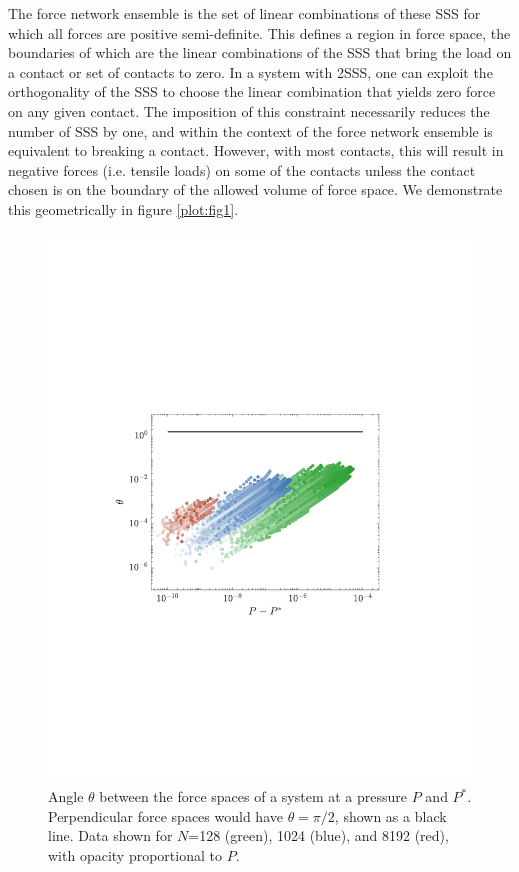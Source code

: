 The force network ensemble is the set of linear combinations of these SSS for which all forces are positive semi-definite. This defines a region in force space, the boundaries of which are the linear combinations of the SSS that bring the load on a contact or set of contacts to zero. 
In a system with 2SSS, one can exploit the orthogonality of the SSS to choose the linear combination that yields zero force on any given contact. The imposition of this constraint necessarily reduces the number of SSS by one, and within the context of the force network ensemble is equivalent to breaking a contact. However, with most contacts, this will result in negative forces (i.e. tensile loads) on some of the contacts unless the contact chosen is on the boundary of the allowed volume of force space. We demonstrate this geometrically in figure \ref{plot:fig1}.  



\begin{figure}[t!]
\includegraphics[width=\columnwidth, trim=94 242 130 260, clip]{contactBreakingPaper/angleVsPressure.pdf}
\caption{Angle $\theta$ between the force spaces of a system at a pressure $P$ and $P^*$. Perpendicular force spaces would have $\theta = \pi/2$, shown as a black line. Data shown for $N$=128 (green), 1024 (blue), and 8192 (red), with opacity proportional to $P$.}
\label{plot:anglevpressure}
\end{figure}




